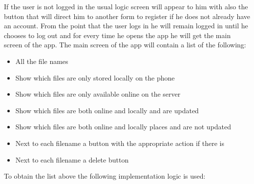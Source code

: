 \documentclass[11pt]{article}
\begin{document}
If the user is not logged in the usual logic screen will appear to him with also the button that will direct him to another form to register if he does not already have an account. From the point that the user logs in he will remain logged in until he chooses to log out and for every time he opens the app he will get the main screen of the app. The main screen of the app will contain a list of the following:

\begin{itemize}
	\item{All the file names}
	\item{Show which files are only stored locally on the phone}
	\item{Show which files are only available online on the server}
	\item{Show which files are both online and locally and are updated}
	\item{Show which files are both online and locally places and are not updated}
	\item{Next to each filename a button with the appropriate action if there is}
	\item{Next to each filename a delete button}
\end{itemize}

To obtain the list above the following implementation logic is used:
\end{document}
